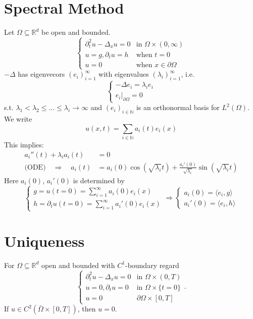 \documentclass{report}
\theoremstyle{tommy}
\begin{document}
  \section{Spectral Method}
  Let \(\Omega \subseteq \mathbb{R}^d\) be open and bounded.
  \[\begin{cases}
    \partial_t^2 u - \Delta_x u = 0 &\text{in }  \Omega \times (0,\infty) \\
    u = g, \partial_t u = h &\text{when } t = 0 \\
    u = 0 &\text{when } x \in \partial \Omega
  \end{cases}\]
  \(-\Delta\) has eigenvecors \((e_i)_{i=1}^\infty\) with eigenvalues \((\lambda_i)_{i=1}^\infty\), i.e.
  \[\begin{cases}
    -\Delta e_i = \lambda_i e_i \\ e_i|_{\partial \Omega} = 0
  \end{cases}\]
  s.t. \(\lambda_1 < \lambda_2 \le \dots \le \lambda_i \to \infty\) and \((e_i)_{i \in \mathbb{N}}\) is an orthonormal basis for \(L^2(\Omega)\).
  We write 
  \[u(x,t) = \sum_{i \in \mathbb{N}} a_i(t) e_i(x)\]
  This implies:
  \begin{align*}
    a_i''(t) + \lambda_i a_i(t) &= 0 \\
    \text{(ODE)} \quad \Rightarrow \quad a_i(t) &= a_i(0) \cos(\sqrt{\lambda_i}t) + \frac{a_i'(0)}{\sqrt{\lambda_i}} \sin(\sqrt{\lambda_i}t)
  \end{align*}
  Here \(a_i(0)\), \(a_i'(0)\) is determined by 
  \[\begin{cases}
    g = u(t=0) = \sum_{i=1}^\infty a_i(0) e_i(x) \\
    h=\partial_t u(t=0) = \sum_{i=1}^\infty a_i'(0) e_i(x)
  \end{cases}
  \Rightarrow \begin{cases}
    a_i(0) = \langle e_i, g \rangle \\ a_i'(0) = \langle e_i, h\rangle
  \end{cases}\]

  \section{Uniqueness}
  For \(\Omega \subseteq \mathbb{R}^d\) open and bounded with \(C^1\)-boundary regard
  \[\begin{cases}
    \partial_t^2 u - \Delta_x u = 0 &\text{in } \Omega \times (0,T) \\
    u = 0, \partial_t u = 0 &\text{in } \Omega \times \{t=0\} \\
    u=0 &\partial \Omega \times [0,T]
  \end{cases}.\]
  If \(u \in C^2(\bar \Omega \times [0,T])\), then \(u = 0\).
\end{document}
